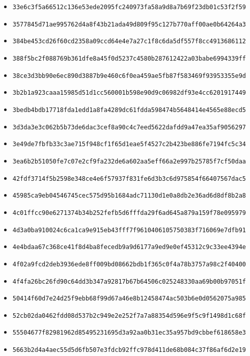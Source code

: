 {\begin{itemize}
    \item \texttt{33e6c3f5a66512c136e53ede2095fc240973fa58a9d8a7b69f23db01c53f2f59}
    \item \texttt{3577845d71ae995762d4a8f43b21ada49d809f95c127b770aff00ae0b64264a3}
    \item \texttt{384be453cd26f60cd2358a09ccd64e4e7a27c1f8c6da5df557f8cc4913686112}
    \item \texttt{388f5bc2f088769b361dfe8a45f0d5237c4580b287612422a03babe6994339ff}
    \item \texttt{38ce3d3bb90e6ec890d3887b9e460c6f0ea459ae5fb87f583469f93953355e9d}
    \item \texttt{3b2b1a923caaa15985d51d1cc560001b598e90d9c06982df93e4cc6201917449}
    \item \texttt{3bedb4bdb17718fda1edd1a8fa4289dc61fdda598474b5648414e4565e88ecd5}
    \item \texttt{3d3da3e3c062b5b73de6dac3cef8a90c4c7eed5622dafdd9a47ea35af9056297}
    \item \texttt{3e49de7fbfb33c3ae715f948cf1f65d1eae5f4527c2b423be886fe7194fc5c34}
    \item \texttt{3ea6b2b51050fe7c07e2cf9fa232de6a602aa5eff66a2e997b25785f7cf50daa}
    \item \texttt{42fdf3714f5b2598e348ce4e6f57937f831fe6d3b3c6d975854f66407567dac5}
    \item \texttt{45985ca9eb04546745cec575d95b1684adc71130d1e0a8db2e36ad6d8df8b2a8}
    \item \texttt{4c01ffcc90e6271374b34b252fefb5d6fffda29f6ad645a879a159f78e095979}
    \item \texttt{4d3a0ba910024c6ca1ca9e915eb43fff7f9610406105750383f716069e7dfb91}
    \item \texttt{4e4bdaa67c368ce41f8d4ba8fecedb9a9d6177a9ed9e0ef45312c9c33ee4394e}
    \item \texttt{4f02a9fcd2deb3936ede8ff009bd08662bdb1f365c0f4a78b3757a98c2f40400}
    \item \texttt{4f4fa26bc26fd90c64dd3b347a92817b67b64506c025248330aa69b00b97051f}
    \item \texttt{50414f60d7e24d25f9ebb68f99d67a46e8b12458474ac503b6e0d0562075a985}
    \item \texttt{52cb02da0462fdd08d537b2c949e2e252f7a7a88354d596e9f5c9f1498d1c68f}
    \item \texttt{55504677f82981962d85495231695d3a92aa0b31ec35a957bd9cbbef618658e3}
    \item \texttt{5663b2d4a4aec55d5d6fb507e3fdcb92ffc978d411de68b084c37f86af6d2e19}

\end{itemize}}
